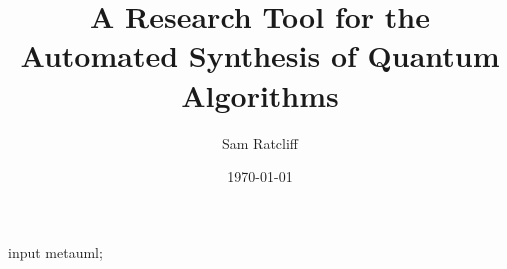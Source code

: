 \documentclass[authoryearcitations]{UoYCSproject}
\author{Sam Ratcliff}
\title{A Research Tool for the Automated Synthesis of Quantum Algorithms}
\date{\today}
\begin{document}
\begin{empfile}
\begin{empcmds}
input metauml;
\end{empcmds}

\maketitle
\listoffigures
\listoftables
\cleardoublepage








% 









\appendix



\end{empfile}
\end{document}
